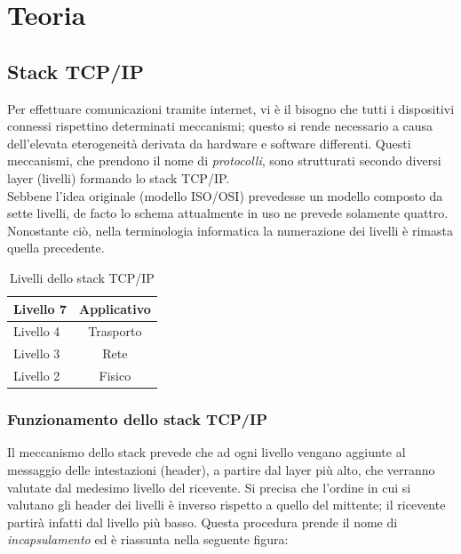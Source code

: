 \chapter{Teoria}

\section{Stack TCP/IP}
Per effettuare comunicazioni tramite internet, vi è il bisogno che tutti i dispositivi connessi rispettino determinati meccanismi; questo si rende necessario a causa dell'elevata eterogeneità derivata da hardware e software differenti.
Questi meccanismi, che prendono il nome di \textit{protocolli}, sono strutturati secondo diversi layer (livelli) formando lo stack TCP/IP.  \\
Sebbene l'idea originale (modello ISO/OSI) prevedesse un modello composto da sette livelli, de facto lo schema attualmente in uso ne prevede solamente quattro. Nonostante ciò, nella terminologia informatica la numerazione dei livelli è rimasta quella precedente.
\\
\begin{table}[htb]
	\centering
	\begin{tabular}{| l | c |}
		\hline
		Livello 7 & Applicativo
		\\
		\hline
		Livello 4 & Trasporto
		\\
		\hline
		Livello 3 & Rete
		\\
		\hline
		Livello 2 & Fisico
		\\
		\hline
		
	\end{tabular}
	\caption{Livelli dello stack TCP/IP}
	\label{tab:stack}
\end{table}

\subsection{Funzionamento dello stack TCP/IP}
Il meccanismo dello stack prevede che ad ogni livello vengano aggiunte al messaggio delle intestazioni (header), a partire dal layer più alto, che verranno valutate dal medesimo livello del ricevente.
Si precisa che l'ordine in cui si valutano gli header dei livelli è inverso rispetto a quello del mittente; il ricevente partirà infatti dal livello più basso.
Questa procedura prende il nome di \textit{incapsulamento} ed è riassunta nella seguente figura:


